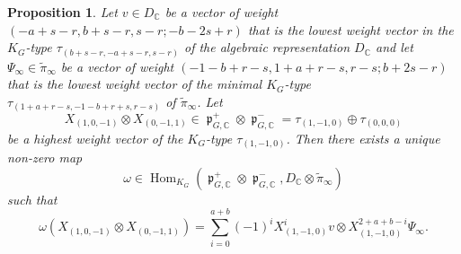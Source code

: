 \documentclass[11pt, a4paper]{amsart}
\theoremstyle{plain}
\newtheorem{proposition}[theorem]{Proposition}
\theoremstyle{definition}
\numberwithin{equation}{section}
\def\CC{\mathbb{C}}
\DeclareMathOperator{\Hom}{Hom}
\DeclareMathOperator{\liep}{\mathfrak p}
\begin{document}
\begin{proposition}
\label{Prop: explicit construnction of the differential form}
    Let $v \in D_{\CC}$ be a vector of weight $(-a + s - r, b + s - r, s - r; -b - 2s + r)$ that is the lowest weight vector in the $K_G$-type $\tau_{(b + s - r, -a + s - r, s - r)}$ of the algebraic representation $D_{\CC}$ and let $\Psi_{\infty} \in \tilde{\pi}_{\infty}$ be a vector of weight $(-1 - b + r - s, 1 + a + r - s, r - s; b + 2s - r)$ that is the lowest weight vector of the minimal $K_{G}$-type $\tau_{(1 + a + r -s, -1 - b + r  + s, r - s)}$ of $\tilde{\pi}_{\infty}$. Let 
    \begin{equation*}
        X_{(1, 0, -1)} \otimes X_{(0, -1, 1)} \in \liep^{+}_{G, \CC} \otimes \liep^{-}_{G, \CC} = \tau_{(1, -1, 0)} \oplus \tau_{(0, 0, 0)}
    \end{equation*}
    be a highest weight vector of the $K_{G}$-type $\tau_{(1, -1, 0)}$. Then there exists a unique non-zero map 
    \begin{equation*}
        \omega \in \Hom_{K_G}(\liep^{+}_{G, \CC} \otimes \liep^{-}_{G, \CC}, D_{\CC} \otimes \tilde{\pi}_{\infty}) 
    \end{equation*}
    such that 
    \begin{equation}
    \label{eqn:form_satisfied}
        \omega( X_{(1, 0, -1)} \otimes X_{(0, -1, 1)}) = \sum\limits_{i = 0}^{a + b} (-1)^{i} X_{(1, -1 ,0)}^{i} v \otimes X^{2 + a + b - i}_{(1, -1, 0)} \Psi_{\infty}. 
    \end{equation}
\end{proposition}
\end{document}
